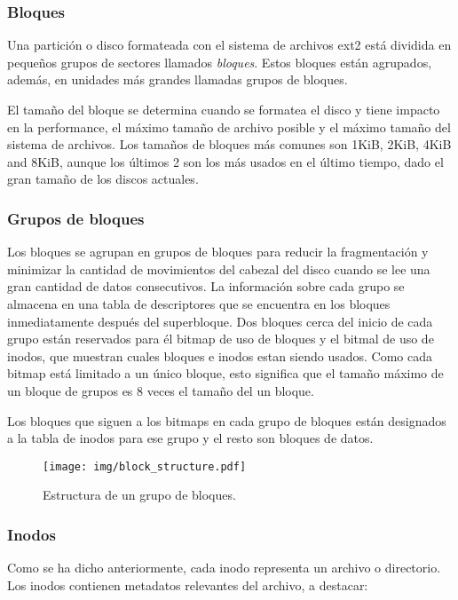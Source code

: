 \subsubsection{Bloques}
Una partición o disco formateada con el sistema de archivos ext2 está dividida en pequeños grupos de sectores llamados \emph{bloques}. Estos bloques están agrupados, además, en unidades más grandes llamadas grupos de bloques.

El tamaño del bloque se determina cuando se formatea el disco y tiene impacto en la performance, el máximo tamaño de archivo posible y el máximo tamaño del sistema de archivos. Los tamaños de bloques más comunes son 1KiB, 2KiB, 4KiB and 8KiB, aunque los últimos 2 son los más usados en el último tiempo, dado el gran tamaño de los discos actuales.

\subsubsection{Grupos de bloques}

Los bloques se agrupan en grupos de bloques para reducir la fragmentación y minimizar la cantidad de movimientos del cabezal del disco cuando se lee una gran cantidad de datos consecutivos. La información sobre cada grupo se almacena en una tabla de descriptores que se encuentra en los bloques inmediatamente después del superbloque. 
Dos bloques cerca del inicio de cada grupo están reservados para \'el bitmap de uso de bloques y el bitmal de uso de inodos, que muestran cuales bloques e inodos estan siendo usados.
Como cada bitmap está limitado a un único bloque, esto significa que el tamaño máximo de un bloque de grupos es 8 veces el tamaño del un bloque.

Los bloques que siguen a los bitmaps en cada grupo de bloques están designados a la tabla de inodos para ese grupo y el resto son bloques de datos.


\begin{figure}
  \centering
  \texttt{[image: img/block\_structure.pdf]}
  \caption{Estructura de un grupo de bloques.}
\end{figure}

\subsubsection{Inodos}

Como se ha dicho anteriormente, cada inodo representa un archivo o directorio. Los inodos contienen metadatos relevantes del archivo, a destacar:

